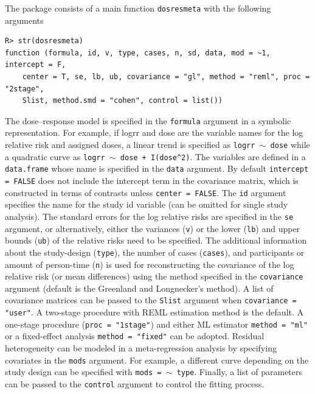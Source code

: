 \documentclass[11pt,a4paper,twoside,openany]{book}\usepackage{knitr}
\begin{document}
{{\noindent The package consists of a main function \texttt{dosresmeta} with the following arguments
\begin{knitrout}\footnotesize
{}\color{fgcolor}\begin{kframe}
\begin{verbatim}
R> str(dosresmeta)
function (formula, id, v, type, cases, n, sd, data, mod = ~1, intercept = F, 
    center = T, se, lb, ub, covariance = "gl", method = "reml", proc = "2stage", 
    Slist, method.smd = "cohen", control = list())  
\end{verbatim}
\end{kframe}
\end{knitrout}

\noindent The dose--response model is specified in the \texttt{formula} argument in a symbolic representation. For example, if logrr and dose are the variable names for the log relative risk and assigned doses, a linear trend is specified as \texttt{logrr $\sim$ dose} while a quadratic curve as \texttt{logrr $\sim$ dose + I(dose\^{}2)}. The variables are defined in a \texttt{data.frame} whose name is specified in the \texttt{data} argument. By default \texttt{intercept = FALSE} does not include the intercept term in the covariance matrix, which is constructed in terms of contrasts unless \texttt{center = FALSE}. The \texttt{id} argument specifies the name for the study id variable (can be omitted for single study analysis). 
The standard errors for the log relative risks are specified in the \texttt{se} argument, or alternatively, either the variances (\texttt{v}) or the lower (\texttt{lb}) and upper bounds (\texttt{ub}) of the relative risks need to be specified. The additional information about the study-design (\texttt{type}), the number of cases (\texttt{cases}), and participants or amount of person-time (\texttt{n}) is used for reconstructing the covariance of the log relative risk (or mean differences) using the method specified in the \texttt{covariance} argument (default is the Greenland and Longnecker’s method). A list of covariance matrices can be passed to the \texttt{Slist} argument when \texttt{covariance = "user"}.
A two-stage procedure with REML estimation method is the default. A one-stage procedure (\texttt{proc = "1stage"}) and either ML estimator \texttt{method = "ml"} or a fixed-effect analysis \texttt{method = "fixed"} can be adopted. Residual heterogeneity can be modeled in a meta-regression analysis by specifying covariates in the \texttt{mods} argument. For example, a different curve depending on the study design can be specified with \texttt{mods = $\sim$ type}. Finally, a list of parameters can be passed to the \texttt{control} argument to control the fitting process.

}}
\end{document}
